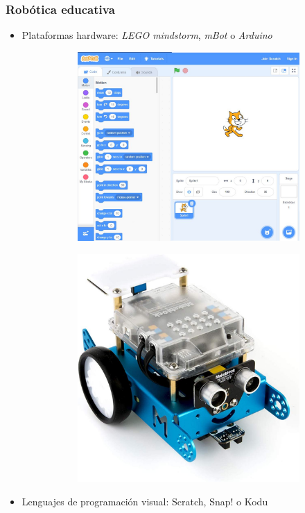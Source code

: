\documentclass[xcolor={table}]{beamer}
\begin{document}
	\begin{frame}
		\frametitle{Robótica educativa}
		\begin{itemize}
	          \item Plataformas hardware: \textit{LEGO mindstorm}, \textit{mBot} o \textit{Arduino}
        \begin{figure}[H]
        \centering
        \begin{subfigure}{\textwidth}
            \includegraphics[scale=0.13]{img/scratch.jpg}
        \label{fig:scratch}
        \end{subfigure}\hfill
        \begin{subfigure}{\textwidth}
            \includegraphics[scale=0.1]{img/mBotReal.jpg}
        \label{fig:mbot}
        \end{subfigure}\hfill
            \label{fig:educativa}
        \end{figure}
        	\item Lenguajes de programación visual: Scratch, Snap! o Kodu
  

\end{itemize}
\end{frame}
\end{document}
